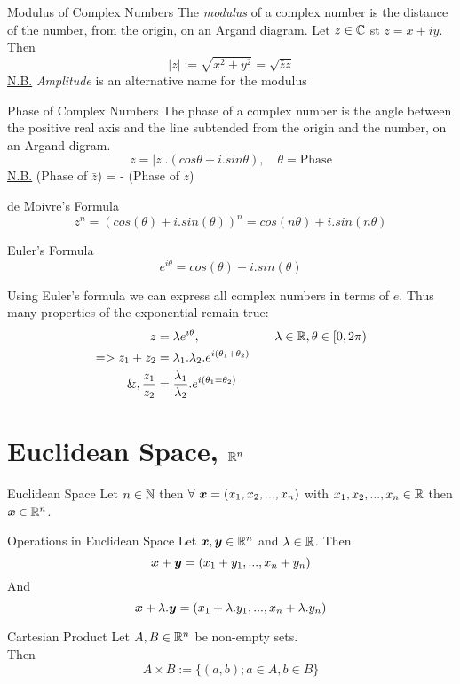 \documentclass[11pt,a4paper]{article}
\begin{document}
\subtitle{Definition 1.15 - }{Modulus of Complex Numbers}
The \textit{modulus} of a complex number is the distance of the number, from the origin, on an Argand diagram.
Let $z \in \mathbb{C}$ st $z = x + iy$. Then
$$|z| := \sqrt{x^2 + y^2} = \sqrt{\bar{z}z}$$
\underline{N.B.} \textit{Amplitude} is an alternative name for the modulus \\

\subtitle{Definition 1.16 - }{Phase of Complex Numbers}
The phase of a complex number is the angle between the positive real axis and the line subtended from the origin and the number, on an Argand digram.$$z = |z|.(cos\theta + i.sin\theta), \quad \theta = \mathrm{Phase}$$
\underline{N.B.} (Phase of $\bar{z}$) = - (Phase of $z$) \\

\subtitle{Theorem 1.17 - }{de Moivre's Formula}
$$z^n = (cos(\theta) +i.sin(\theta))^n = cos(n\theta)+i.sin(n\theta)$$

\subtitle{Theorem 1.18 - }{Euler's Formula}
$$e^{i\theta} = cos(\theta) + i.sin(\theta)$$

\subtitle{Remark 1.19}{}
Using Euler's formula we can express all complex numbers in terms of $e$. Thus many properties of the exponential remain true:
\begin{alignat*}{2}
  z &= \lambda e^{i\theta}, && \quad \lambda \in \mathbb{R} , \theta \in \left[0, 2\pi\right) \\
  => z_1 + z_2 &= \lambda_1 . \lambda_2. e^{i(\theta_1 + \theta_2)} \\
  \&, \frac{z_1}{z_2} &= \frac{\lambda_1}{\lambda_2}.e^{i(\theta_1 = \theta_2)}
\end{alignat*}

\section{Euclidean Space, $\mathbb{R}^n$}

\subtitle{Definition 2.01 - }{Euclidean Space}
Let $n \in \mathbb{N}$ then $\forall\ \boldsymbol{x} = (x_1, x_2, ... , x_n)$ with $x_1, x_2, ... , x_n \in \mathbb{R}$ then $\boldsymbol{x} \in \mathbb{R}^n$. \\

\subtitle{Theorem 2.02 - }{Operations in Euclidean Space}
Let $\boldsymbol{x}, \boldsymbol{y} \in \mathbb{R}^n$ and $\lambda \in \mathbb{R}$.
Then
$$\boldsymbol{x} + \boldsymbol{y} = (x_1 + y_1, ... , x_n + y_n)$$
And
$$\boldsymbol{x} + \lambda.\boldsymbol{y} = (x_1 + \lambda.y_1, ... , x_n + \lambda.y_n)$$

\subtitle{Definition 2.03 - }{Cartesian Product}
Let $A, B \in \mathbb{R}^n$ be non-empty sets. \\
Then $$A \times B := \{(a,b); a \in A, b \in B\}$$
\end{document}
